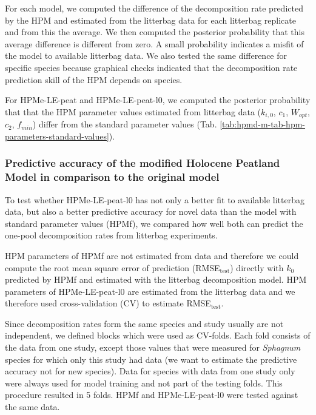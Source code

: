 \documentclass[esd, manuscript]{copernicus}
\begin{document}
For each model, we computed the difference of the decomposition rate predicted by the HPM and estimated from the litterbag data for each litterbag replicate and from this the average. We then computed the posterior probability that this average difference is different from zero. A small probability indicates a misfit of the model to available litterbag data. We also tested the same difference for specific species because graphical checks indicated that the decomposition rate prediction skill of the HPM depends on species.

For HPMe-LE-peat and HPMe-LE-peat-l0, we computed the posterior probability that that the HPM parameter values estimated from litterbag data (\(k_{i,0}\), \(c_1\), \(W_{opt}\), \(c_2\), \(f_{min}\)) differ from the standard parameter values (Tab. \ref{tab:hpmd-m-tab-hpm-parameters-standard-values}).

\hypertarget{sdm-003-methods-11}{%
\subsubsection{Predictive accuracy of the modified Holocene Peatland Model in comparison to the original model}\label{sdm-003-methods-11}}

To test whether HPMe-LE-peat-l0 has not only a better fit to available litterbag data, but also a better predictive accuracy for novel data than the model with standard parameter values (HPMf), we compared how well both can predict the one-pool decomposition rates from litterbag experiments.

HPM parameters of HPMf are not estimated from data and therefore we could compute the root mean square error of prediction (RMSE\(_\text{test}\)) directly with \(k_0\) predicted by HPMf and estimated with the litterbag decomposition model. HPM parameters of HPMe-LE-peat-l0 are estimated from the litterbag data and we therefore used cross-validation (CV) to estimate RMSE\(_\text{test}\).

Since decomposition rates form the same species and study usually are not independent, we defined blocks which were used as CV-folds. Each fold consists of the data from one study, except those values that were measured for \emph{Sphagnum} species for which only this study had data (we want to estimate the predictive accuracy not for new species). Data for species with data from one study only were always used for model training and not part of the testing folds. This procedure resulted in 5 folds. HPMf and HPMe-LE-peat-l0 were tested against the same data.
\end{document}
